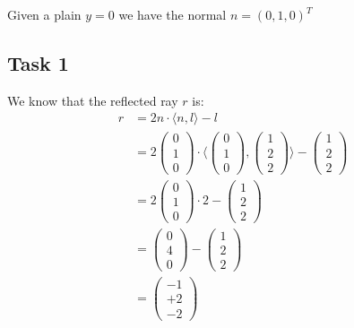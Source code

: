 \documentclass[tikz,14pt,fleqn]{article}
\begin{document}
Given a plain $y = 0$ we have the normal $ n = (0, 1, 0)^T $

\subsection{Task 1}

We know that the reflected ray $r$ is:
\begin{align*}
   r 
   &= 2n \cdot \langle n, l \rangle - l \\
   &= 2\begin{pmatrix} 0 \\ 1 \\ 0 \end{pmatrix} \cdot \langle \begin{pmatrix} 0 \\ 1 \\ 0 \end{pmatrix}, \begin{pmatrix} 1 \\ 2 \\ 2 \end{pmatrix} \rangle - \begin{pmatrix} 1 \\ 2 \\ 2 \end{pmatrix}\\
   &= 2\begin{pmatrix} 0 \\ 1 \\ 0 \end{pmatrix} \cdot 2 - \begin{pmatrix} 1 \\ 2 \\ 2 \end{pmatrix}\\
   &= \begin{pmatrix} 0 \\ 4 \\ 0 \end{pmatrix} - \begin{pmatrix} 1 \\ 2 \\ 2 \end{pmatrix}\\
   &= \begin{pmatrix} -1 \\ +2 \\ -2 \end{pmatrix}
\end{align*}
\end{document}
